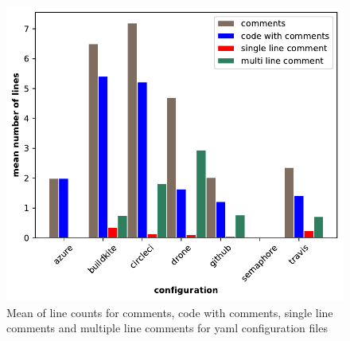 \documentclass[10pt,conference]{IEEEtran}
\begin{document}
\begin{figure}[!ht]
  \centering
  \includegraphics[width=\textwidth]{../src/results/line structure yaml comments.pdf}
  \caption[alt text]{Mean of line counts for comments, code with comments, single line comments and multiple line comments for yaml configuration files}
  \label{fig:lines_structure_yaml_comments}
\end{figure}
\end{document}
